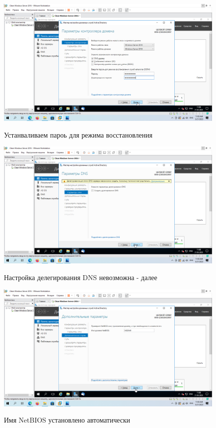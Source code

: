 \documentclass[a4paper]{article}
\begin{document}
  \begin{figure}[H]
    \centering
    \includegraphics[width=\textwidth]{11_0037}
    \label{img:37}
    \caption{Устанваливаем пароь для режима восстановления}
  \end{figure}

  \begin{figure}[H]
    \centering
    \includegraphics[width=\textwidth]{11_0038}
    \label{img:38}
    \caption{Настройка делегирования DNS невозможна - далее}
  \end{figure}

  \begin{figure}[H]
    \centering
    \includegraphics[width=\textwidth]{11_0039}
    \label{img:39}
    \caption{Имя NetBIOS установлено автоматически}
  \end{figure}
\end{document}
